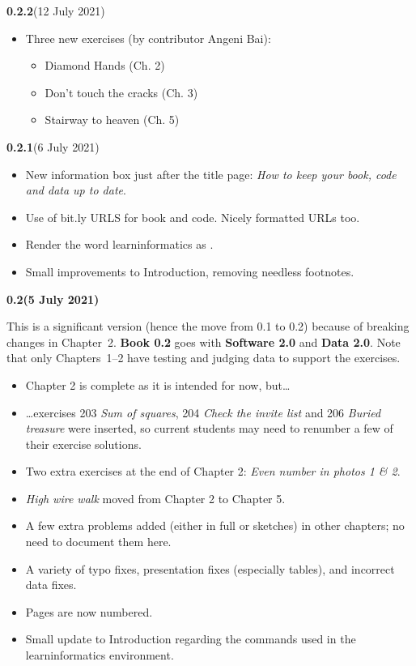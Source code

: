 

{
\small

\newcommand{\versionmarker}[2]{\textbf{#1}\quad(#2)}
\newcommand{\versionmarkerspecial}[2]{{\color{BrickRed}\bfseries#1\quad(#2)}}

\versionmarker{0.2.2}{12 July 2021}
\begin{itemize}
  \item Three new exercises (by contributor Angeni Bai):
    \begin{itemize}
      \item Diamond Hands (Ch. 2)
      \item Don't touch the cracks (Ch. 3)
      \item Stairway to heaven (Ch. 5)
    \end{itemize}
\end{itemize}

\versionmarker{0.2.1}{6 July 2021}
\begin{itemize}
  \item New information box just after the title page: \emph{How to keep your book, code
    and data up to date}.
  \item Use of bit.ly URLS for book and code. Nicely formatted URLs too.
  \item Render the word learninformatics as \learninformatics{}.
  \item Small improvements to Introduction, removing needless footnotes.
\end{itemize}

\versionmarkerspecial{0.2}{5 July 2021}

This is a significant version (hence the move from 0.1 to 0.2) because of breaking changes
in Chapter~2. \textbf{Book 0.2} goes with \textbf{Software 2.0} and \textbf{Data 2.0}.
Note that only Chapters~1--2 have testing and judging data to support the exercises.

\begin{itemize}
  \item Chapter 2 is complete as it is intended for now, but\dots
  \item \dots exercises 203 \emph{Sum of squares}, 204 \emph{Check the invite list} and 206
    \emph{Buried treasure} were inserted, so current students may need to renumber a few
    of their exercise solutions.
  \item Two extra exercises at the end of Chapter 2: \emph{Even number in photos 1 \& 2}.
  \item \emph{High wire walk} moved from Chapter 2 to Chapter 5.
  \item A few extra problems added (either in full or sketches) in other chapters; no need
    to document them here.
  \item A variety of typo fixes, presentation fixes (especially tables), and incorrect
    data fixes.
  \item Pages are now numbered.
  \item Small update to Introduction regarding the commands used in the
    \textsf{learninformatics} environment.
\end{itemize}

}
